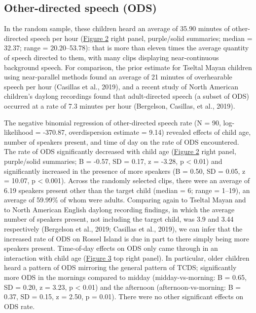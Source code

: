 \documentclass[
  english,
  ,man,floatsintext]{apa6}
\begin{document}
\hypertarget{other-directed-speech-ods}{%
\subsection{Other-directed speech (ODS)}\label{other-directed-speech-ods}}

In the random sample, these children heard an average of 35.90 minutes of other-directed speech per hour (\protect\hyperlink{fig2}{Figure 2} right panel, purple/solid summaries; median = 32.37; range = 20.20--53.78): that is more than eleven times the average quantity of speech directed to them, with many clips displaying near-continuous background speech. For comparison, the prior estimate for Tseltal Mayan children using near-parallel methods found an average of 21 minutes of overhearable speech per hour (Casillas et al., 2019), and a recent study of North American children's daylong recordings found that adult-directed speech (a subset of ODS) occurred at a rate of 7.3 minutes per hour (Bergelson, Casillas, et al., 2019).

The negative binomial regression of other-directed speech rate (N = 90, log-likelihood = -370.87, overdispersion estimate = 9.14) revealed effects of child age, number of speakers present, and time of day on the rate of ODS encountered. The rate of ODS significantly decreased with child age (\protect\hyperlink{fig2}{Figure 2} right panel, purple/solid summaries; B = -0.57, SD = 0.17, z = -3.28, p \textless{} 0.01) and significantly increased in the presence of more speakers (B = 0.50, SD = 0.05, z = 10.07, p \textless{} 0.001). Across the randomly selected clips, there were an average of 6.19 speakers present other than the target child (median = 6; range = 1--19), an average of 59.99\% of whom were adults. Comparing again to Tseltal Mayan and to North American English daylong recording findings, in which the average number of speakers present, not including the target child, was 3.9 and 3.44 respectively (Bergelson et al., 2019; Casillas et al., 2019), we can infer that the increased rate of ODS on Rossel Island is due in part to there simply being more speakers present. Time-of-day effects on ODS only came through in an interaction with child age (\protect\hyperlink{fig3}{Figure 3} top right panel). In particular, older children heard a pattern of ODS mirroring the general pattern of TCDS; significantly more ODS in the mornings compared to midday (midday-vs-morning: B = 0.65, SD = 0.20, z = 3.23, p \textless{} 0.01) and the afternoon (afternoon-vs-morning: B = 0.37, SD = 0.15, z = 2.50, p = 0.01). There were no other significant effects on ODS rate.
\end{document}
